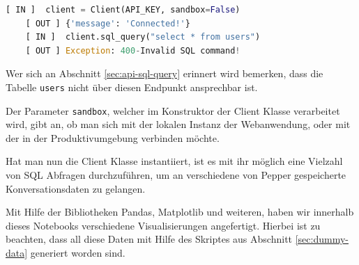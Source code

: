 \begin{lstlisting}[language=Python]
    [ IN ]  client = Client(API_KEY, sandbox=False)
    [ OUT ] {'message': 'Connected!'}
    [ IN ]  client.sql_query("select * from users")
    [ OUT ] Exception: 400-Invalid SQL command!
\end{lstlisting}

Wer sich an Abschnitt \ref{sec:api-sql-query} erinnert wird bemerken, dass die Tabelle \verb|users| nicht über diesen Endpunkt ansprechbar ist.

Der Parameter \verb|sandbox|, welcher im Konstruktor der Client Klasse verarbeitet wird, gibt an, ob man sich mit der lokalen Instanz der Webanwendung, oder mit der in der Produktivumgebung verbinden möchte.

Hat man nun die Client Klasse instantiiert, ist es mit ihr möglich eine Vielzahl von SQL Abfragen durchzuführen, um an verschiedene von Pepper gespeicherte Konversationsdaten zu gelangen.

Mit Hilfe der Bibliotheken Pandas, Matplotlib und weiteren, haben wir innerhalb dieses Notebooks verschiedene Visualisierungen angefertigt. Hierbei ist zu beachten, dass all diese Daten mit Hilfe des Skriptes aus Abschnitt \ref{sec:dummy-data} generiert worden sind.\\

